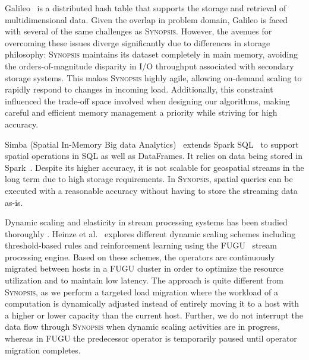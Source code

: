 Galileo~\cite{malensek2016analytic,malensek2015fast} is a distributed hash table that supports the storage and retrieval of multidimensional data. Given the overlap in problem domain, Galileo is faced with several of the same challenges as \textsc{Synopsis}. However, the avenues for overcoming these issues diverge significantly due to differences in storage philosophy: \textsc{Synopsis} maintains its dataset completely in main memory, avoiding the orders-of-magnitude disparity in I/O throughput associated with secondary storage systems. This makes \textsc{Synopsis} highly agile, allowing on-demand scaling to rapidly respond to changes in incoming load. Additionally, this constraint influenced the trade-off space involved when designing our algorithms, making careful and efficient memory management a priority while striving for high accuracy.

Simba (Spatial In-Memory Big data Analytics)~\cite{xiesimba} extends Spark SQL~\cite{armbrust2015spark} to support spatial operations in SQL as well as DataFrames. It relies on data being stored in Spark~\cite{zaharia2010spark}. Despite its higher accuracy, it is not scalable for geospatial streams in the long term due to high storage requirements. In \textsc{Synopsis}, spatial queries can be executed with a reasonable accuracy without having to store the streaming data as-is.

Dynamic scaling and elasticity in stream processing systems has been studied thoroughly \cite{heinze2014auto, gulisano2012streamcloud, castro2013integrating, loesing2012stormy, heinze2013elastic, schneider2009elastic}.
Heinze et al.~\cite{heinze2014auto} explores different dynamic scaling schemes including threshold-based rules and reinforcement learning using the FUGU~\cite{heinze2013elastic} stream processing engine.
Based on these schemes, the operators are continuously migrated between hosts in a FUGU cluster in order to optimize the resource utilization and to maintain low latency.
The approach is quite different from \textsc{Synopsis}, as we perform a targeted load migration where the workload of a computation is dynamically adjusted instead of entirely moving it to a host with a higher or lower capacity than the current host.
Further, we do not interrupt the data flow through \textsc{Synopsis} when dynamic scaling activities are in progress, whereas in FUGU the predecessor operator is temporarily paused until operator migration completes.

